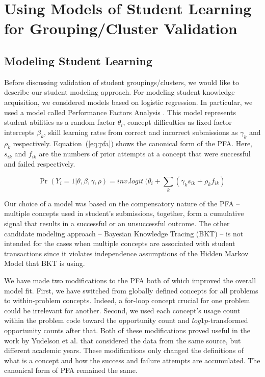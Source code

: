 \documentclass{sigchi}
\begin{document}
\section{Using Models of Student Learning for Grouping/Cluster Validation}

\subsection{Modeling Student Learning}

Before discussing validation of student groupings/clusters, we would like to describe our  student modeling approach. For modeling student knowledge acquisition, we considered models based on logistic regression. In particular, we used a model called Performance Factors Analysis \cite{pfa2009}. This model represents student abilities as a random factor $\theta_i$, concept difficulties as fixed-factor intercepts $\beta_k$, skill learning rates from correct and incorrect submissions as $\gamma_k$ and $\rho_k$ respectively. Equation~(\ref{eq:pfa}) shows the canonical form of the PFA. Here, $s_{ik}$ and $f_{ik}$ are the numbers of prior attempts at a concept that were successful and failed respectively. \vspace{-14pt}

\begin{equation}
    \Pr(Y_i = 1 | \theta, \beta, \gamma, \rho) = inv.logit~( \theta_i + \sum_{k}{(\gamma_k s_{ik} + \rho_k f_{ik})}~
    \label{eq:pfa}
\end{equation}\vspace{-14pt}

Our choice of a model was based on the compensatory nature of the PFA -- multiple concepts used in student's submissions, together, form a cumulative signal that results in a successful or an unsuccessful outcome. The other candidate modeling approach -- Bayesian Knowledge Tracing (BKT) \cite{bkt1995} -- is not intended for the cases when multiple concepts are associated with student transactions since it violates independence assumptions of the Hidden Markov Model that BKT is using.

We have made two modifications to the PFA both of which improved the overall model fit. First, we have switched from globally defined concepts for all problems to within-problem concepts. Indeed, a for-loop concept crucial for one problem could be irrelevant for another. Second, we used each concept's usage count within the problem code toward the opportunity count and $log1p$-transformed opportunity counts after that. Both of these modifications proved useful in the work by Yudelson et al. \cite{yudelson2014investigating} that considered the data from the same source, but different academic years. These modifications only changed the definitions of what is a concept and how the success and failure attempts are accumulated. The canonical form of PFA remained the same.
\end{document}
